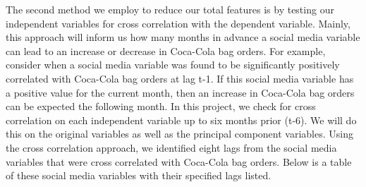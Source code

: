 \documentclass[12pt,oneside]{chicagocapstone}
\begin{document}
The second method we employ to reduce our total features is by testing our independent variables for cross correlation with the dependent variable. Mainly, this approach will inform us how many months in advance a social media variable can lead to an increase or decrease in Coca-Cola bag orders. For example, consider when a social media variable was found to be significantly positively correlated with Coca-Cola bag orders at lag t-1. If this social media variable has a positive value for the current month, then an increase in Coca-Cola bag orders can be expected the following month. In this project, we check for cross correlation on each independent variable up to six months prior (t-6). We will do this on the original variables as well as the principal component variables. Using the cross correlation approach, we identified eight lags from the social media variables that were cross correlated with Coca-Cola bag orders. Below is a table of these social media variables with their specified lags listed.
\end{document}

